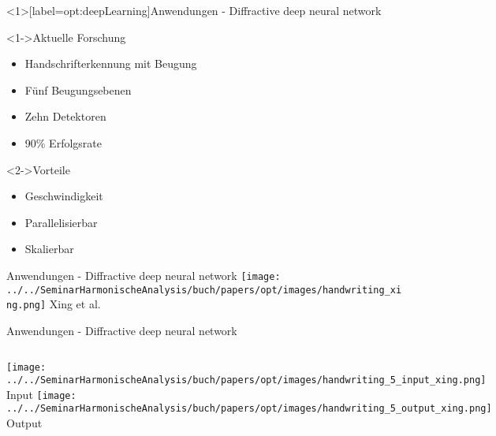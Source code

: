 \begin{frame}<1>[label=opt:deepLearning]{Anwendungen - Diffractive deep neural network}
    \begin{block}<1->{Aktuelle Forschung}
        \begin{itemize}
            \item Handschrifterkennung mit Beugung
            \item Fünf Beugungsebenen
            \item Zehn Detektoren
            \item 90\% Erfolgsrate
        \end{itemize}
    \end{block}
    \begin{block}<2->{Vorteile}
        \begin{itemize}
            \item Geschwindigkeit
            \item Parallelisierbar
            \item Skalierbar
        \end{itemize}
    \end{block}
\end{frame}

\begin{frame}{Anwendungen - Diffractive deep neural network}
    \centering
    \texttt{[image: ../../SeminarHarmonischeAnalysis/buch/papers/opt/images/handwriting\_xing.png]}
    \vfill
    Xing et al. \cite{opt:Lin.2018}
\end{frame}

\begin{frame}{Anwendungen - Diffractive deep neural network}
    \centering
    \begin{columns}
        \texttt{[image: ../../SeminarHarmonischeAnalysis/buch/papers/opt/images/handwriting\_5\_input\_xing.png]}
        Input
        \texttt{[image: ../../SeminarHarmonischeAnalysis/buch/papers/opt/images/handwriting\_5\_output\_xing.png]}
        Output
    \end{columns}
\end{frame}

